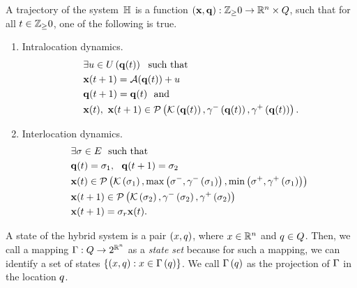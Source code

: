 A trajectory of the system~$\mathbb{H}$ is a function
$\left({\bf x},{\bf q}\right):\mathbb{Z}_\geq 0\rightarrow\mathbb{R}^n\times Q$, such
that for all
$t\in\mathbb{Z}_\geq 0$, one of the following is true.
\begin{enumerate}
\item Intralocation dynamics.
\begin{align}~\label{eqn:intralocation}
\begin{split}
& \exists u\in U\left({\bf q}(t)\right)~~\text{such that}\\
& {\bf x}(t+1) = \mathcal{A}({\bf q}(t))+u\\ 
& {\bf q}(t+1) = {\bf q}(t)~~
\text{and}\\
& {\bf x}(t),~{\bf x}(t+1)\in\mathcal{P}\left(\mathcal{K}\left({\bf q}(t)\right),\gamma^-\left({\bf q}(t)\right),\gamma^+\left({\bf q}(t)\right)\right).
\end{split}
\end{align}
\item Interlocation dynamics.
\begin{align} 
\begin{split}
& \exists \sigma\in E~~\text{such that}\\
& {\bf q}(t)=\sigma_{1},~~{\bf q}(t+1)=\sigma_{2}\\
& {\bf x}(t)\in\mathcal{P}\left(\mathcal{K}\left(\sigma_{1}\right),\max\left(\sigma^-,\gamma^-\left(\sigma_{1}\right)\right),\min\left(\sigma^+,\gamma^+\left(\sigma_{1}\right)\right)\right) \\
& {\bf x}(t+1)\in \mathcal{P}\left(\mathcal{K}\left(\sigma_{2}\right),\gamma^-\left(\sigma_{2}\right),\gamma^+\left(\sigma_{2}\right)\right)\\
& {\bf x}(t+1) = \sigma_r{\bf x}(t).
\end{split}
\end{align}
\end{enumerate}

A state of the hybrid system is a pair $(x,q)$, where
$x\in\mathbb{R}^n$ and $q\in Q$.  Then, we call a mapping
$\Gamma:Q\rightarrow 2^{\mathbb{R}^n}$ as a \emph{state set}
because for such a mapping, we can identify a set of states
$\left\{\left(x,q\right):x\in\Gamma\left(q\right)\right\}$.  We call
$\Gamma\left(q\right)$ as the projection of $\Gamma$ in the
location $q$.


